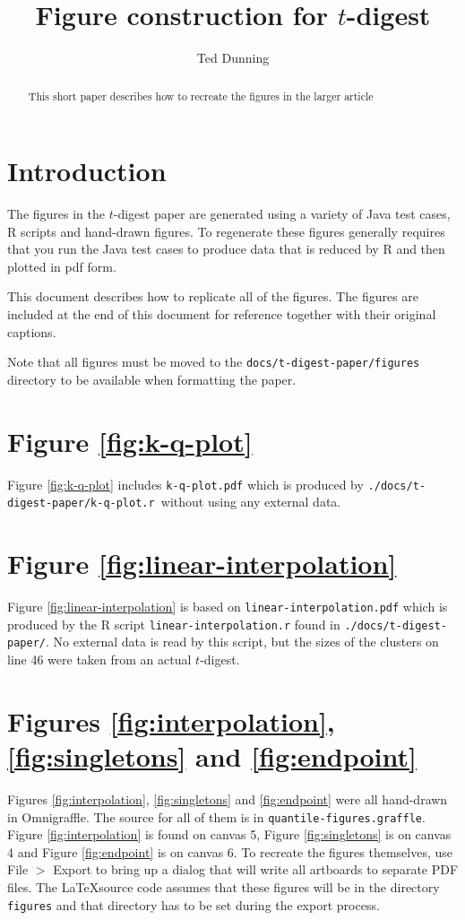 \documentclass[]{statsoc}
\title[Figure construction]{Figure construction for $t$-digest}
\author{Ted Dunning}
\date{}                                           %
\begin{document}
\begin{abstract}
This short paper describes how to recreate the figures in the larger article
\end{abstract}
\maketitle
\section{Introduction}
The figures in the $t$-digest paper are generated using a variety of Java test cases, R scripts and hand-drawn figures. To regenerate these figures generally requires that you run the Java test cases to produce data that is reduced by R and then plotted in pdf form.

This document describes how to replicate all of the figures. The figures are included at the end of this document for reference together with their original captions.

Note that all figures must be moved to the {\tt docs/t-digest-paper/figures} directory to be available when formatting the paper.
\section{Figure \ref{fig:k-q-plot}}
Figure \ref{fig:k-q-plot} includes {\tt k-q-plot.pdf} which is produced by {\tt ./docs/t-digest-paper/k-q-plot.r }without using any external data.
\section{Figure \ref{fig:linear-interpolation}}
Figure \ref{fig:linear-interpolation} is based on {\tt linear-interpolation.pdf} which is produced by the R script {\tt linear-interpolation.r} found in {\tt ./docs/t-digest-paper/}. No external data is read by this script, but the sizes of the clusters on line 46 were taken from an actual $t$-digest.

\section{Figures \ref{fig:interpolation}, \ref{fig:singletons} and \ref{fig:endpoint}}
Figures \ref{fig:interpolation}, \ref{fig:singletons} and \ref{fig:endpoint} were all hand-drawn in Omnigraffle. The source for all of them is in {\tt quantile-figures.graffle}. Figure \ref{fig:interpolation} is found on canvas 5, Figure \ref{fig:singletons} is on canvas 4 and Figure \ref{fig:endpoint} is on canvas 6. To recreate the figures themselves, use File $>$ Export to bring up a dialog that will write all artboards to separate PDF files. The  \LaTeX source code assumes that these figures will be in the directory {\tt figures} and that directory has to be set during the export process.
\end{document}
